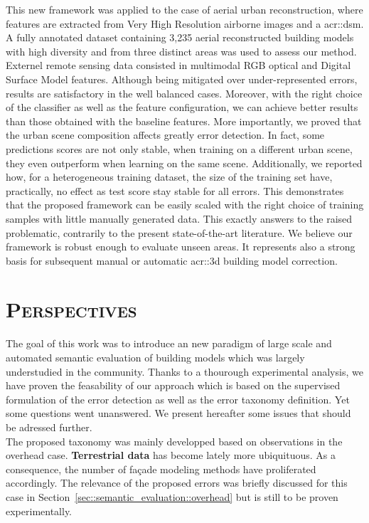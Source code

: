     This new framework was applied to the case of aerial urban reconstruction, where features are extracted from Very High Resolution airborne images and a \acrlong{acr::dsm}.
    A fully annotated dataset containing 3,235 aerial reconstructed building models with high diversity and from three distinct areas was used to assess our method.
    Externel remote sensing data consisted in multimodal RGB optical and Digital Surface Model features.
    Although being mitigated over under-represented errors, results are satisfactory in the well balanced cases.
    Moreover, with the right choice of the classifier as well as the feature configuration, we can achieve better results than those obtained with the baseline features.
    More importantly, we proved that the urban scene composition affects greatly error detection.
    In fact, some predictions scores are not only stable, when training on a different urban scene, they even outperform when learning on the same scene.
    Additionally, we reported how, for a heterogeneous training dataset, the size of the training set have, practically, no effect as test score stay stable for all errors.
    This demonstrates that the proposed framework can be easily scaled with the right choice of training samples with little manually generated data.
    This exactly answers to the raised problematic, contrarily to the present state-of-the-art literature.
    We believe our framework is robust enough to evaluate unseen areas.
    It represents also a strong basis for subsequent manual or automatic \gls{acr::3d} building model correction.

\section{\textsc{Perspectives}}
    \label{sec::conclusion::perspectives}
    The goal of this work was to introduce an new paradigm of large scale and automated semantic evaluation of building models which was largely understudied in the community.
    Thanks to a thourough experimental analysis, we have proven the feasability of our approach which is based on the supervised formulation of the error detection as well as the error taxonomy definition.
    Yet some questions went unanswered.
    We present hereafter some issues that should be adressed further.\\

    The proposed taxonomy was mainly developped based on observations in the overhead case.
    \textbf{Terrestrial data} has become lately more ubiquituous.
    As a consequence, the number of façade modeling methods have proliferated accordingly.
    The relevance of the proposed errors was briefly discussed for this case in Section~\ref{sec::semantic_evaluation::overhead} but is still to be proven experimentally.\\

